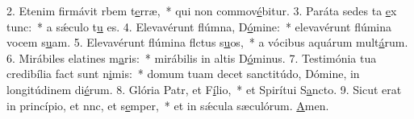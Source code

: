 2. Etenim firmávit rbem t\uline{e}rræ,~* qui non commov\uline{é}bitur.
3. Paráta sedes ta \uline{e}x tunc:~* a sǽculo t\uline{u} es.
4. Elevavérunt flúmna, D\uline{ó}mine:~* elevavérunt flúmina vocem s\uline{u}am.
5. Elevavérunt flúmina flctus s\uline{u}os,~* a vócibus aquárum mult\uline{á}rum.
6. Mirábiles elatines m\uline{a}ris:~* mirábilis in altis D\uline{ó}minus.
7. Testimónia tua credibília fact sunt n\uline{i}mis:~* domum tuam decet sanctitúdo, Dómine, in longitúdinem di\uline{é}rum.
8. Glória Patr, et F\uline{í}lio,~* et Spirítui S\uline{a}ncto.
9. Sicut erat in princípio, et nnc, et s\uline{e}mper,~* et in sǽcula sæculórum. \uline{A}men.
